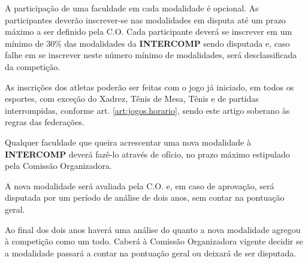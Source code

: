 \begin{article}
	A participação de uma faculdade em cada modalidade é opcional. As participantes deverão inscrever-se nas modalidades em disputa até um prazo máximo a ser definido pela C.O. Cada participante deverá se inscrever em um mínimo de 30\% das modalidades da \textbf{INTERCOMP} sendo disputada e, caso falhe em se inscrever neste número mínimo de modalidades, será desclassificada da competição.
\end{article}

\begin{article}
	As inscrições dos atletas poderão ser feitas com o jogo já iniciado, em todos os esportes, com exceção do Xadrez, Tênis de Mesa, Tênis e de partidas interrompidas, conforme art. \ref{art:jogos.horario}\ulo, sendo este artigo soberano às regras das federações.
\end{article}

\begin{article}
	Qualquer faculdade que queira acrescentar uma nova modalidade à \textbf{INTERCOMP} deverá fazê-lo através de ofício, no prazo máximo estipulado pela Comissão Organizadora.

	\begin{xparagraph}
		A nova modalidade será avaliada pela C.O. e, em caso de aprovação, será disputada por um período de análise de dois anos, sem contar na pontuação geral.
	\end{xparagraph}

	\begin{xparagraph}
		Ao final dos dois anos haverá uma análise do quanto a nova modalidade agregou à competição como um todo. Caberá à Comissão Organizadora vigente decidir se a modalidade passará a contar na pontuação geral ou deixará de ser disputada.
	\end{xparagraph}
\end{article}
